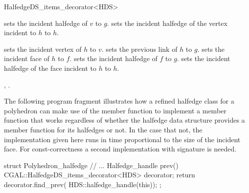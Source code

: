 \begin{ccRefClass}{HalfedgeDS_items_decorator<HDS>}

    {sets the incident halfedge of $v$ to $g$.}
\ccGlue
{}
    {sets the incident halfedge of the vertex incident to $h$ to $h$.}

    {sets the incident vertex of $h$ to $v$.}
\ccGlue
{}
    {sets the previous link of $h$ to $g$.}
\ccGlue
{}
    {sets the incident face of $h$ to $f$.}
\ccGlue
{}
    {sets the incident halfedge of $f$ to $g$.}
\ccGlue
{}
    {sets the incident halfedge of the face incident to $h$ to $h$.}


\ccSeeAlso

,
.

\ccExample

The following program fragment illustrates how a refined halfedge
class for a polyhedron can make use of the  member
function to implement a  member function that works
regardless of whether the halfedge data structure  provides a
 member function for its halfedges or not. In the case that not,
the implementation given here runs in time proportional to the size of the 
incident face. For const-correctness a second implementation with signature
 is needed.

\begin{ccExampleCode}
struct Polyhedron_halfedge {
    // ...
    Halfedge_handle  prev() {
        CGAL::HalfedgeDS_items_decorator<HDS> decorator;
        return decorator.find_prev( HDS::halfedge_handle(this));
    }
};
\end{ccExampleCode}


\end{ccRefClass}

\ccRefPageEnd


